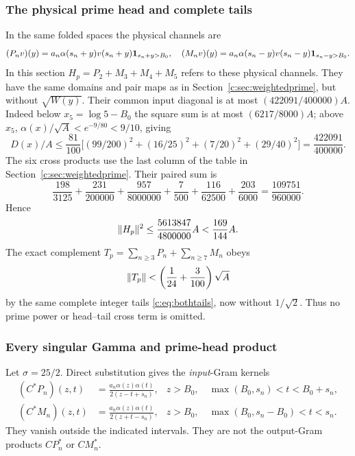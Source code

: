 \documentclass[11pt,a4paper]{article}
\numberwithin{equation}{section}
\theoremstyle{definition}\newtheorem{definition}[theorem]{Definition}
\theoremstyle{remark}\newtheorem{remark}[theorem]{Remark}
\begin{document}
\subsubsection{The physical prime head and complete tails}
In the same folded spaces the physical channels are
\[
 (P_nv)(y)=a_n\alpha(s_n+y)v(s_n+y)\mathbf1_{s_n+y>{B_0}},\quad
 (M_nv)(y)=a_n\alpha(s_n-y)v(s_n-y)\mathbf1_{s_n-y>{B_0}}.
\]
In this section $H_p=P_2+M_3+M_4+M_5$ refers to these physical channels.
They have the same domains and pair maps as in Section~\ref{c:sec:weightedprime}, but without $\sqrt{W(y)}$.
Their common input diagonal is at most $(422091/400000)A$.
Indeed below $x_5=\log5-{B_0}$ the square sum is at most $(6217/8000)A$;
above $x_5$, $\alpha(x)/\sqrt A<e^{-9/80}<9/10$, giving
\[
 D(x)/A\le\frac{81}{100}\bigl[(99/200)^2+(16/25)^2
 +(7/20)^2+(29/40)^2\bigr]=\frac{422091}{400000}.
\]
The six cross products use the last column of the table in Section~\ref{c:sec:weightedprime}.
Their paired sum is
\[
 \frac{198}{3125}+\frac{231}{200000}+\frac{957}{8000000}
 +\frac7{500}+\frac{116}{62500}+\frac{203}{6000}
 =\frac{109751}{960000}.
\]
Hence
\begin{equation}\label{c:eq:physicalhead}
 \lVert H_p\rVert^2\le\frac{5613847}{4800000}A<\frac{169}{144}A.
\end{equation}
The exact complement $T_p=\sum_{n\ge3}P_n+\sum_{n\ge7}M_n$ obeys
\begin{equation}\label{c:eq:physicaltail}
 \lVert T_p\rVert<\left(\frac1{24}+\frac3{100}\right)\sqrt A
\end{equation}
by the same complete integer tails \eqref{c:eq:bothtails}, now without $1/\sqrt2$.
Thus no prime power or head--tail cross term is omitted.

\subsubsection{Every singular Gamma and prime-head product}
Let $\sigma=25/2$. Direct substitution gives the \emph{input}-Gram kernels
\begin{align}
 (C^*P_n)(z,t)&=\frac{a_n\alpha(z)\alpha(t)}
                      {2(z-t+s_n)},&
 z>{B_0},\quad\max({B_0},s_n)<t<{B_0}+s_n,\label{c:eq:inputgramplus}\\
 (C^*M_n)(z,t)&=\frac{a_n\alpha(z)\alpha(t)}
                      {2(z+t-s_n)},&
 z>{B_0},\quad\max({B_0},s_n-{B_0})<t<s_n.\label{c:eq:inputgramminus}
\end{align}
They vanish outside the indicated intervals. They are not the output-Gram products $CP_n^*$ or $CM_n^*$.
\end{document}
